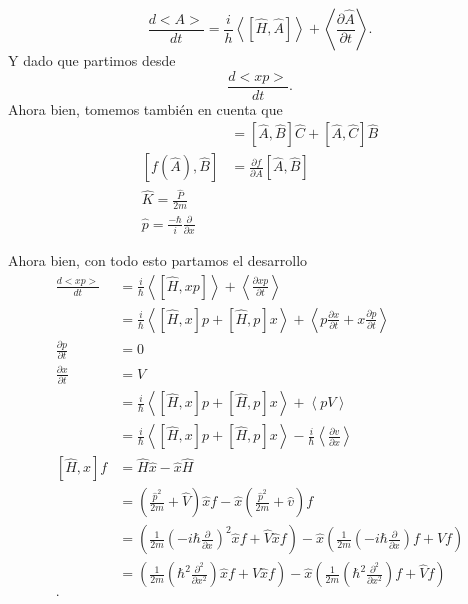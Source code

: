 \documentclass[12pt]{exam}
\begin{document}
\begin{enumerate}
    \begin{equation}
      \frac{d<A>}{dt}=\frac{i}{h}\left<[\hat{H},\hat{A}] \right>+\left<\frac{\partial\hat{A}}{\partial t}\right>
    .\end{equation}
    Y dado que partimos desde \[
    \frac{d<xp>}{dt}
    .\] Ahora bien, tomemos también en cuenta que
    \begin{align}
      [\hat{A},\hat{B}\hat{C}] &= [\hat{A},\hat{B}]\hat{C} + [\hat{A},\hat{C}]\hat{B}\\
      [f(\hat{A}),\hat{B}] &= \frac{\partial f}{\partial A} [\hat{A},\hat{B}]\\
      \hat{K} = \frac{\hat{P}}{2m}\\
      \hat{p} = \frac{-\hbar}{i}\frac{\partial}{\partial x}
  \end{align}
  
  Ahora bien, con todo esto partamos el desarrollo
  \begin{align*}
    \frac{d<xp>}{dt}&=\frac{i}{\hbar}\left<[\hat{H},xp]\right>+\left<\frac{\partial xp}{\partial t}\right>\\
		    &=\frac{i}{\hbar}\left<[\hat{H},x]p+[\hat{H},p]x\right>+\left<p\frac{\partial x}{\partial t} + x\frac{\partial p}{\partial t}\right>\\
    \frac{\partial p}{\partial t} &= 0\\
    \frac{\partial x}{\partial t} &= V\\
				  &= \frac{i}{\hbar}\left<[\hat{H},x]p+[\hat{H},p]x\right>+\left<pV\right>\\
				  &= \frac{i}{\hbar}\left<[\hat{H},x]p+[\hat{H},p]x\right>-\frac{i}{\hbar}\left<\frac{\partial v}{\partial x}\right>\\
    [\hat{H},x]f &= \hat{H}\hat{x}-\hat{x}\hat{H}\\
		 &= \left( \frac{\hat{p}^2}{2m} + \hat{V} \right) \hat{x}f - \hat{x}\left( \frac{\hat{p}^2}{2m}+\hat{v} \right)f\\
		 &=\left(\frac{1}{2m}\left( -i\hbar\frac{\partial}{\partial x} \right)^2\hat{x}f+ \hat{V}\hat{x}f \right)  - \hat{x}\left( \frac{1}{2m}\left( -i\hbar \frac{\partial}{\partial x}\right)f + \hat{V}f \right)\\
		 &=\left(\frac{1}{2m}\left( \hbar^2\frac{\partial^2}{\partial x^2} \right)\hat{x}f+ \hat{V}\hat{x}f \right)  - \hat{x}\left( \frac{1}{2m}\left( \hbar^2 \frac{\partial^2}{\partial x^2}\right)f + \hat{V}f \right)\\
  .\end{align*}
\end{enumerate}
\end{document}
